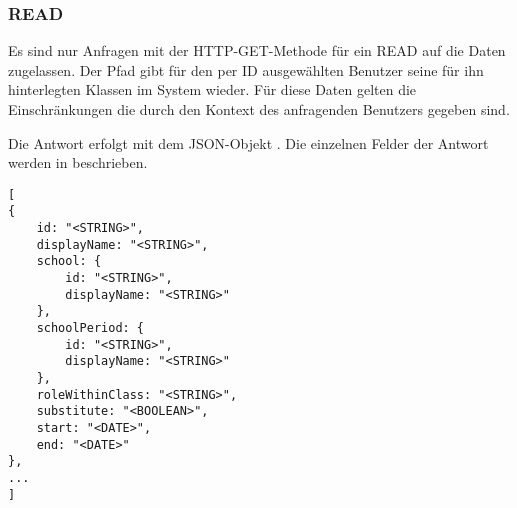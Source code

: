 \subsubsection{READ}
\label{sec:rest:api:users:id:classes:read}
Es sind nur Anfragen mit der HTTP-GET-Methode für ein READ auf die Daten zugelassen.
Der Pfad gibt für den per ID ausgewählten Benutzer seine für ihn hinterlegten Klassen im System wieder.
Für diese Daten gelten die Einschränkungen die durch den Kontext des anfragenden Benutzers gegeben sind.

Die Antwort erfolgt mit dem JSON-Objekt . 
Die einzelnen Felder der Antwort werden in  beschrieben.

\begin{lstlisting}[caption={JSON-Antwort für einen GET-Aufruf des Pfads /api/users/\$id/classes},label={lst:code:rest:api:users:id:classes:read:ret},frame=tlrb]
[
{
	id: "<STRING>",
	displayName: "<STRING>",
	school: {
		id: "<STRING>",
		displayName: "<STRING>"
	},
	schoolPeriod: {
		id: "<STRING>",
		displayName: "<STRING>"
	},
	roleWithinClass: "<STRING>",
    substitute: "<BOOLEAN>",
	start: "<DATE>",
	end: "<DATE>"
},
...
]
\end{lstlisting}

